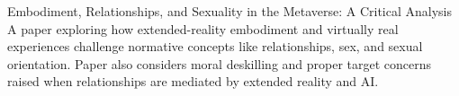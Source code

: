 \vspace{\sectionpadding}
\entry
    {Embodiment, Relationships, and Sexuality in the Metaverse: A Critical Analysis}
    {}
    {}
    {A paper exploring how extended-reality embodiment and virtually real experiences challenge normative concepts like relationships, sex, and sexual orientation. Paper also considers moral deskilling and proper target concerns raised when relationships are mediated by extended reality and AI.
    }
